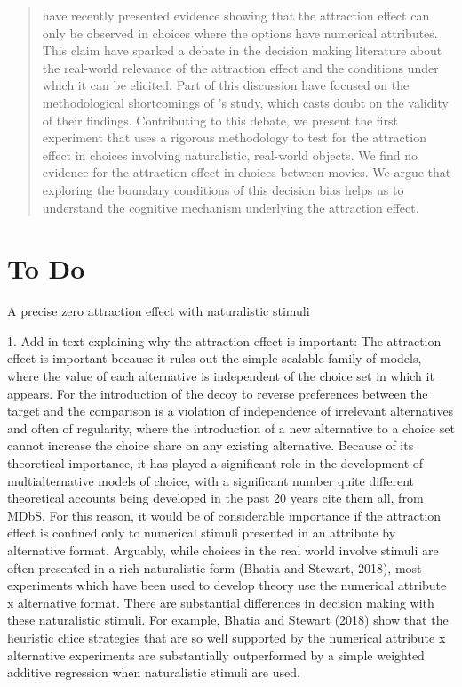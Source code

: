 \documentclass[12pt, a4paper]{article}
\title{}
\author{}
\date{}
\begin{document}
 
\begin{abstract}
  have recently presented evidence showing that the attraction effect can only be observed in choices where the options have numerical attributes. This claim have sparked a debate in the decision making literature about the real-world relevance of the attraction effect and the conditions under which it can be elicited. Part of this discussion have focused on the methodological shortcomings of \citeauthor{Frederick2014}'s study, which casts doubt on the validity of their findings. Contributing to this debate, we present the first experiment that uses a rigorous methodology to test for the attraction effect in choices involving naturalistic, real-world objects. We find no evidence for the attraction effect in choices between movies. We argue that exploring the boundary conditions of this decision bias helps us to understand the cognitive mechanism underlying the attraction effect.
   
\end{abstract}

\newpage

\section{To Do}

A precise zero attraction effect with naturalistic stimuli

1. Add in text explaining why the attraction effect is important: The attraction effect is important because it rules out the simple scalable family of models, where the value of each alternative is independent of the choice set in which it appears. For the introduction of the decoy to reverse preferences between the target and the comparison is a violation of independence of irrelevant alternatives and often of regularity, where the introduction of a new alternative to a choice set cannot increase the choice share on any existing alternative. Because of its theoretical importance, it has played a significant role in the development of multialternative models of choice, with a significant number quite different theoretical accounts being developed in the past 20 years {cite them all, from MDbS}. For this reason, it would be of considerable importance if the attraction effect is confined only to numerical stimuli presented in an attribute by alternative format. Arguably, while choices in the real world involve stimuli are often presented in a rich naturalistic form (Bhatia and Stewart, 2018), most experiments which have been used to develop theory use the numerical attribute x alternative format. There are substantial differences in decision making with these naturalistic stimuli. For example, Bhatia and Stewart (2018) show that the heuristic chice strategies that are so well supported by  the numerical attribute x alternative experiments are substantially outperformed by a simple weighted additive regression when naturalistic stimuli are used.
\end{document}
